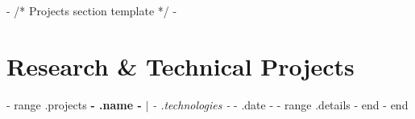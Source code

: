 {{- /* Projects section template */ -}}
\section{Research \& Technical Projects}
    \resumeSubHeadingListStart
{{- range .projects}}
      \resumeProjectHeading
          {\textbf{ {{- .name -}} } $|$ \emph{ {{- .technologies -}} }}{ {{- .date -}} }
          \resumeItemListStart
{{- range .details}}
{{- end}}
          \resumeItemListEnd
{{- end}}
    \resumeSubHeadingListEnd
